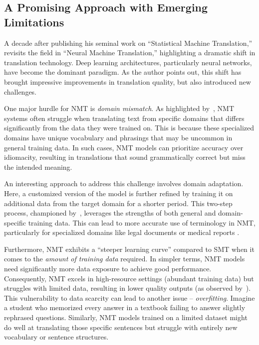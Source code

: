 {{\subsection{A Promising Approach with Emerging Limitations}

A decade after publishing his seminal work on ``Statistical Machine Translation,'' \textcite{koehn2020neural} revisits the field in ``Neural Machine Translation,'' highlighting a dramatic shift in translation technology. Deep learning architectures, particularly neural networks, have become the dominant paradigm. As the author points out, this shift has brought impressive improvements in translation quality, but also introduced new challenges.

One major hurdle for NMT is \textit{domain mismatch}. As highlighted by~\textcite{koehn-knowles-2017-six}, NMT systems often struggle when translating text from specific domains that differs significantly from the data they were trained on. This is because these specialized domains have unique vocabulary and phrasings that may be uncommon in general training data. In such cases, NMT models can prioritize accuracy over idiomacity, resulting in translations that sound grammatically correct but miss the intended meaning. 

An interesting approach to address this challenge involves domain adaptation. Here, a customized version of the model is further refined by training it on additional data from the target domain for a shorter period. This two-step process, championed by~\textcite{LuongPM15, FreitagA16}, leverages the strengths of both general and domain-specific training data. This can lead to more accurate use of terminology in NMT, particularly for specialized domains like legal documents or medical reports \parencite{matusov-etal-2019-customizing, mirkin2015personalized}.

Furthermore, NMT exhibits a ``steeper learning curve'' compared to SMT when it comes to the \textit{amount of training data} required. In simpler terms, NMT models need significantly more data exposure to achieve good performance. Consequently, NMT excels in high-resource settings (abundant training data) but struggles with limited data, resulting in lower quality outputs (as observed by~\textcite{koehn-knowles-2017-six}). This vulnerability to data scarcity can lead to another issue -- \emph{overfitting}. Imagine a student who memorized every answer in a textbook failing to answer slightly rephrased questions. Similarly, NMT models trained on a limited dataset might do well at translating those specific sentences but struggle with entirely new vocabulary or sentence structures.

}}
